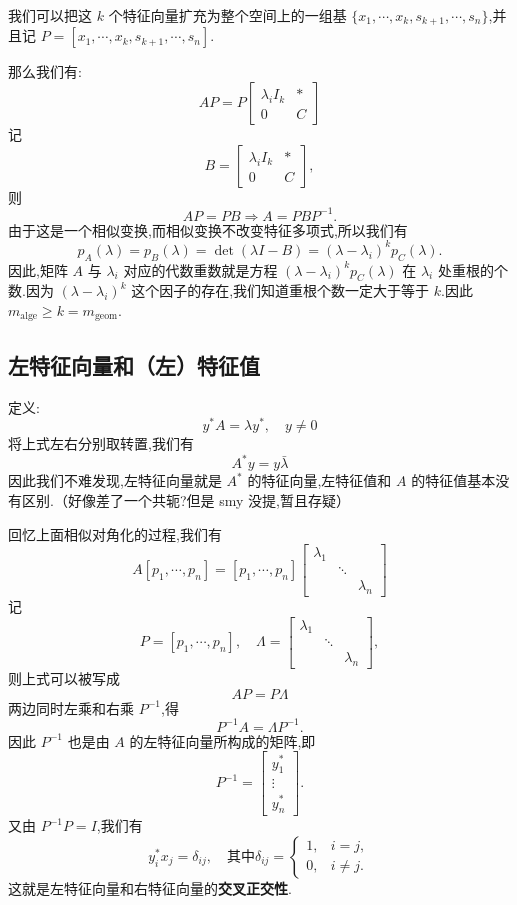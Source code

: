 我们可以把这 $k$ 个特征向量扩充为整个空间上的一组基 $\{x_1,\cdots,x_k,s_{k+1},\cdots,s_n\}$,并且记 $P = [x_1,\cdots,x_k,s_{k+1},\cdots,s_n]$.

那么我们有:
\[
    AP = P
    \begin{bmatrix}
        \lambda_i I_k & * \\
        0 & C
    \end{bmatrix}
\]
记
\[
    B = \begin{bmatrix}
        \lambda_i I_k & * \\
        0 & C
    \end{bmatrix},
\]
则
\[
    AP = PB \Rightarrow A = PBP^{-1}.
\]
由于这是一个相似变换,而相似变换不改变特征多项式,所以我们有
\[
    p_A(\lambda) = p_B(\lambda) = \det(\lambda I - B) = (\lambda - \lambda_i)^k p_C(\lambda).
\]
因此,矩阵 $A$ 与 $\lambda_i$ 对应的代数重数就是方程 $(\lambda - \lambda_i)^k p_C(\lambda)$ 在 $\lambda_i$ 处重根的个数.因为 $(\lambda - \lambda_i)^k$ 这个因子的存在,我们知道重根个数一定大于等于 $k$.因此 $m_{\mathrm{alge}} \ge k = m_{\mathrm{geom}}$.

\subsection{左特征向量和（左）特征值}

定义:
\[
    y^*A = \lambda y^*, \quad y \ne 0
\]
将上式左右分别取转置,我们有
\[
    A^*y = y\bar{\lambda}
\]
因此我们不难发现,左特征向量就是 $A^*$ 的特征向量,左特征值和 $A$ 的特征值基本没有区别.（好像差了一个共轭?但是 smy 没提,暂且存疑）

回忆上面相似对角化的过程,我们有
\[
    A[p_1,\cdots,p_n] = [p_1,\cdots,p_n]
    \begin{bmatrix}
        \lambda_1 & & \\
        & \ddots & \\
        & & \lambda_n
    \end{bmatrix}
\]
记
\[
    P = [p_1,\cdots,p_n], \quad \Lambda =
    \begin{bmatrix}
        \lambda_1 & & \\
        & \ddots & \\
        & & \lambda_n
    \end{bmatrix},
\]
则上式可以被写成
\[
    AP = P\Lambda
\]
两边同时左乘和右乘 $P^{-1}$,得
\[
    P^{-1}A = \Lambda P^{-1}.
\]
因此 $P^{-1}$ 也是由 $A$ 的左特征向量所构成的矩阵,即
\[
    P^{-1} =
    \begin{bmatrix}
        y_1^* \\
        \vdots \\
        y_n^*
    \end{bmatrix}.
\]
又由 $P^{-1}P = I$,我们有
\[
    y_i^*x_j = \delta_{ij}, \quad \text{其中} \delta_{ij} =
    \begin{cases}
        1, & i=j, \\
        0, & i \ne j.
    \end{cases}
\]
这就是左特征向量和右特征向量的\textbf{交叉正交性}.

